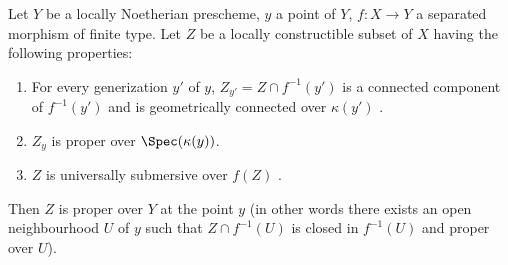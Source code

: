 \begin{proposition}[15.7.9]
\label{IV.15.7.9}
Let $Y$ be a locally Noetherian prescheme, $y$ a point of $Y$, $f:X\to Y$ a separated morphism of finite type.
Let $Z$ be a locally constructible subset of $X$ having the following properties:
\begin{enumerate}[label=(\roman*)]
  \item For every generization $y'$ of $y$, $Z_{y'}=Z\cap f^{-1}(y')$ is a connected component of $f^{-1}(y')$ and is geometrically connected over $\kappa(y')$ .
  \item $Z_y$ is proper over $\Spec(\kappa(y))$.
  \item $Z$ is universally submersive over $f(Z)$ .
\end{enumerate}
Then $Z$ is proper over $Y$ at the point $y$ (in other words  there exists an open neighbourhood $U$ of $y$ such that $Z\cap f^{-1}(U)$ is closed in $f^{-1}(U)$ and proper over $U$).
\end{proposition}

